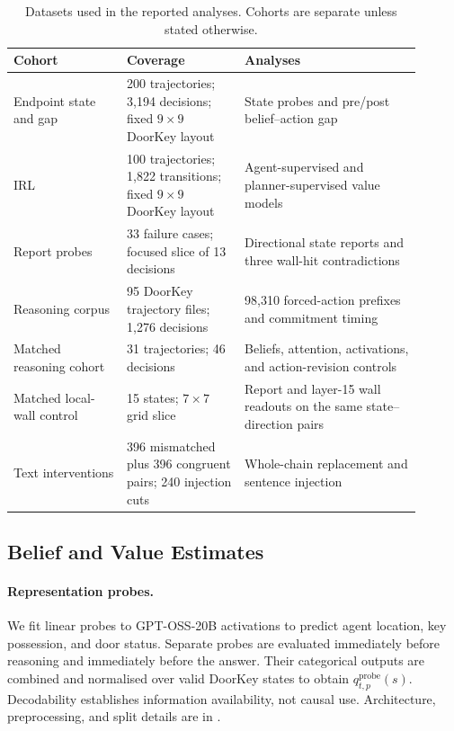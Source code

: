\documentclass{article}
\begin{document}
\begin{table}[t]
\centering\small
\begin{tabular}{p{0.25\linewidth}p{0.26\linewidth}p{0.39\linewidth}}
\toprule
Cohort & Coverage & Analyses \\
\midrule
Endpoint state and gap & 200 trajectories; 3,194 decisions; fixed $9\times9$ DoorKey layout & State probes and pre/post belief--action gap \\
IRL & 100 trajectories; 1,822 transitions; fixed $9\times9$ DoorKey layout & Agent-supervised and planner-supervised value models \\
Report probes & 33 failure cases; focused slice of 13 decisions & Directional state reports and three wall-hit contradictions \\
Reasoning corpus & 95 DoorKey trajectory files; 1,276 decisions & 98,310 forced-action prefixes and commitment timing \\
Matched reasoning cohort & 31 trajectories; 46 decisions & Beliefs, attention, activations, and action-revision controls \\
Matched local-wall control & 15 states; $7\times7$ grid slice & Report and layer-15 wall readouts on the same state--direction pairs \\
Text interventions & 396 mismatched plus 396 congruent pairs; 240 injection cuts & Whole-chain replacement and sentence injection \\
\bottomrule
\end{tabular}
\caption{Datasets used in the reported analyses. Cohorts are separate unless stated otherwise.}
\label{tab:data-summary}
\end{table}

\subsection{Belief and Value Estimates}
\label{sec:estimating-beliefs}

\paragraph{Representation probes.}\label{sec:activation-based-estimation}
We fit linear probes to GPT-OSS-20B activations to predict agent location, key possession, and door status. Separate probes are evaluated immediately before reasoning and immediately before the answer. Their categorical outputs are combined and normalised over valid DoorKey states to obtain $q_{t,p}^{\mathrm{probe}}(s)$. Decodability establishes information availability, not causal use. Architecture, preprocessing, and split details are in .
\end{document}
